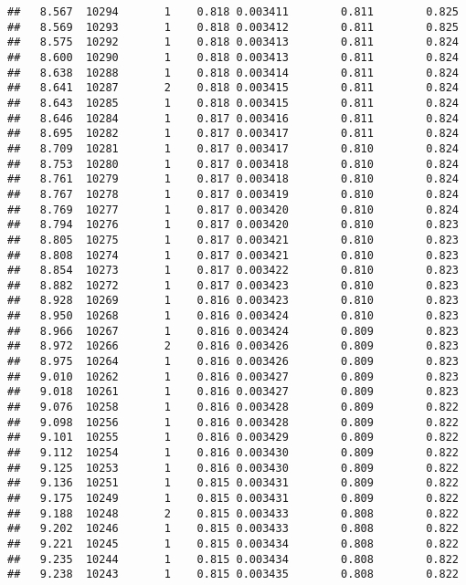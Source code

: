 \documentclass[
]{book}
\begin{document}
\begin{verbatim}
##   8.567  10294       1    0.818 0.003411        0.811        0.825
##   8.569  10293       1    0.818 0.003412        0.811        0.825
##   8.575  10292       1    0.818 0.003413        0.811        0.824
##   8.600  10290       1    0.818 0.003413        0.811        0.824
##   8.638  10288       1    0.818 0.003414        0.811        0.824
##   8.641  10287       2    0.818 0.003415        0.811        0.824
##   8.643  10285       1    0.818 0.003415        0.811        0.824
##   8.646  10284       1    0.817 0.003416        0.811        0.824
##   8.695  10282       1    0.817 0.003417        0.811        0.824
##   8.709  10281       1    0.817 0.003417        0.810        0.824
##   8.753  10280       1    0.817 0.003418        0.810        0.824
##   8.761  10279       1    0.817 0.003418        0.810        0.824
##   8.767  10278       1    0.817 0.003419        0.810        0.824
##   8.769  10277       1    0.817 0.003420        0.810        0.824
##   8.794  10276       1    0.817 0.003420        0.810        0.823
##   8.805  10275       1    0.817 0.003421        0.810        0.823
##   8.808  10274       1    0.817 0.003421        0.810        0.823
##   8.854  10273       1    0.817 0.003422        0.810        0.823
##   8.882  10272       1    0.817 0.003423        0.810        0.823
##   8.928  10269       1    0.816 0.003423        0.810        0.823
##   8.950  10268       1    0.816 0.003424        0.810        0.823
##   8.966  10267       1    0.816 0.003424        0.809        0.823
##   8.972  10266       2    0.816 0.003426        0.809        0.823
##   8.975  10264       1    0.816 0.003426        0.809        0.823
##   9.010  10262       1    0.816 0.003427        0.809        0.823
##   9.018  10261       1    0.816 0.003427        0.809        0.823
##   9.076  10258       1    0.816 0.003428        0.809        0.822
##   9.098  10256       1    0.816 0.003428        0.809        0.822
##   9.101  10255       1    0.816 0.003429        0.809        0.822
##   9.112  10254       1    0.816 0.003430        0.809        0.822
##   9.125  10253       1    0.816 0.003430        0.809        0.822
##   9.136  10251       1    0.815 0.003431        0.809        0.822
##   9.175  10249       1    0.815 0.003431        0.809        0.822
##   9.188  10248       2    0.815 0.003433        0.808        0.822
##   9.202  10246       1    0.815 0.003433        0.808        0.822
##   9.221  10245       1    0.815 0.003434        0.808        0.822
##   9.235  10244       1    0.815 0.003434        0.808        0.822
##   9.238  10243       1    0.815 0.003435        0.808        0.822

\end{verbatim}
\end{document}
